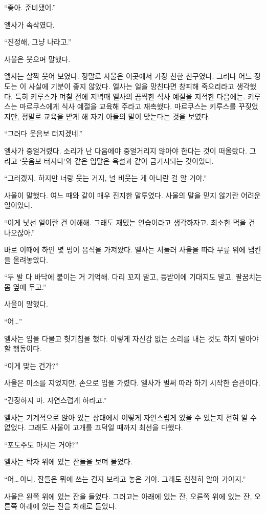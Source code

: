 ``좋아. 준비됐어.''

엘사가 속삭였다.

``진정해, 그냥 나라고.''

사울은 웃으며 말했다.

엘사는 살짝 웃어 보였다. 정말로 사울은 이곳에서 가장 친한 친구였다. 그러나 어느 정도는 이 사실에 기분이 좋지 않았다. 엘사는 일을 망친다면 창피해 죽으리라고 생각했다. 특히 키루스가 며칠 전에 저녁때 엘사의 끔찍한 식사 예절을 지적한 다음에는. 키루스는 마르쿠스에게 식사 예절을 교육해 주라고 재촉했다. 마르쿠스는 키루스를 꾸짖었지만, 정말로 교육을 받게 해 자기 아들의 말이 맞는다는 것을 보였다.

``그러다 웃음보 터지겠네.''

엘사가 중얼거렸다. 소리가 난 다음에야 중얼거리지 않아야 한다는 것이 떠올랐다. 그리고 `웃음보 터지다'와 같은 입말은 욕설과 같이 금기시되는 것이었다.

``그러겠지. 하지만 너랑 웃는 거지, 널 비웃는 게 아니란 걸 알 거야.''

사울이 말했다. 여느 때와 같이 매우 진지한 말투였다. 사울의 말을 믿지 않기란 어려운 일이었다.

``이게 낯선 일이란 건 이해해. 그래도 재밌는 연습이라고 생각하자고. 최소한 먹을 건 나오잖아.''

바로 이때에 하인 몇 명이 음식을 가져왔다. 엘사는 서둘러 사울을 따라 무릎 위에 냅킨을 올려놓았다.

``두 발 다 바닥에 붙이는 거 기억해. 다리 꼬지 말고, 등받이에 기대지도 말고. 팔꿈치는 몸 옆에 두고.''

사울이 말했다.

``어\ldots''

엘사는 입을 다물고 헛기침을 했다. 이렇게 자신감 없는 소리를 내는 것도 하지 말아야 할 행동이다.

``이게 맞는 건가?''

사울은 미소를 지었지만, 손으로 입을 가렸다. 엘사가 벌써 따라 하기 시작한 습관이다.

``긴장하지 마. 자연스럽게 하라고.''

엘사는 기계적으로 앉아 있는 상태에서 어떻게 자연스럽게 있을 수 있는지 전혀 알 수 없었다. 그래도 사울이 고개를 끄덕일 때까지 최선을 다했다.

``포도주도 마시는 거야?''

엘사는 탁자 위에 있는 잔들을 보며 물었다.

``어\ldots\,아니. 잔들은 뭐에 쓰는 건지 보라고 놓은 거야. 그래도 천천히 알아 가야지.''

사울은 왼쪽 위에 있는 잔을 들었다. 그러고는 아래에 있는 잔, 오른쪽 위에 있는 잔, 오른쪽 아래에 있는 잔을 차례로 들었다.

